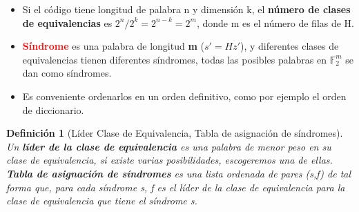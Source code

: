 \documentclass{beamer}
\theoremstyle{plain}
\newtheorem{definicion} [Definicion]{Definición}
\theoremstyle{example}
\theoremstyle{example}
\begin{document}
\begin{frame}  \footnotesize
\begin{itemize} 

\item Si el código tiene longitud de palabra n y dimensión k, el \textbf{número de clases de equivalencias} es $2^n / 2^k = 2^{n-k} =2^m$, donde m es el número de filas de H. 

\item \textcolor{red}{\textbf{Síndrome}} es una palabra de longitud \textbf{m} ($ s'= H z'$), y diferentes clases de equivalencias tienen diferentes síndromes, todas las posibles palabras en $\mathbb{F}_2^m$ se dan como síndromes.

\item  Es conveniente ordenarlos en un orden definitivo, como por ejemplo el orden de diccionario. 

\end{itemize} 
\begin{definicion}[Líder Clase de Equivalencia, Tabla  de asignación de síndromes]

Un \textbf{líder de la clase de equivalencia} es una palabra de menor peso en su clase de equivalencia, si existe varias posibilidades, escogeremos una de ellas.\\
\vspace*{10pt}
\textbf{Tabla de asignación de síndromes}  es una lista ordenada de pares (s,f) de tal forma que, para cada síndrome s, f es el líder de la clase de equivalencia para la clase de equivalencia que tiene el síndrome s.
\end{definicion}

\end{frame} 
\end{document}
